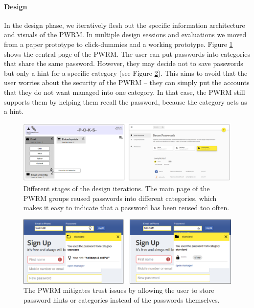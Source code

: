 \paragraph{Design} 
In the design phase, we iteratively flesh out the specific information architecture and visuals of the PWRM. In multiple design sessions and evaluations we moved from a paper prototype to click-dummies and a working prototype. Figure \ref{fig:pwrm:conceptfinal} shows the central page of the PWRM. The user can put passwords into categories that share the same password. However, they may decide not to save passwords but only a hint for a specific category (see Figure \ref{fig:pwrm:hintboxes}). This aims to avoid that the user worries about the security of the PWRM -- they can simply put the accounts that they do not want managed into one category. In that case, the PWRM still supports them by helping them recall the password, because the category acts as a hint. 

\begin{figure}[hp]
	\centering
	\includegraphics[width=\linewidth]{figures/pwrm/concept_final}
	\caption{Different stages of the design iterations. The main page of the PWRM groups reused passwords into different categories, which makes it easy to indicate that a password has been reused too often.}
	\label{fig:pwrm:conceptfinal}
\end{figure}

\begin{figure}[hp]
	\centering
	\includegraphics[width=0.9\linewidth]{figures/pwrm/hintboxes}
	\caption{The PWRM mitigates trust issues by allowing the user to store password hints or categories instead of the passwords themselves.}
	\label{fig:pwrm:hintboxes}
\end{figure}

